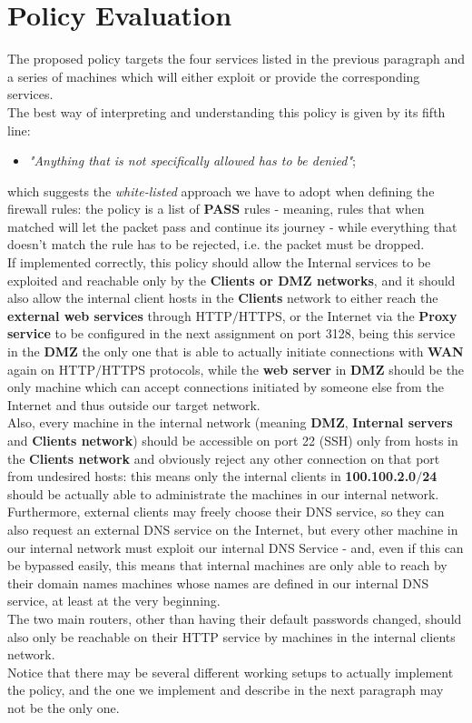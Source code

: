\section{Policy Evaluation}
The proposed policy targets the four services listed in the previous paragraph and a series of machines which will either exploit or provide the corresponding services.\\
The best way of interpreting and understanding this policy is given by its fifth line:\\
\begin{itemize}
\item \textit{"Anything that is not specifically allowed has to be denied"};
\end{itemize}

which suggests the \textit{white-listed} approach we have to adopt when defining the firewall rules: the policy is a list of \textbf{PASS} rules - meaning, rules that when matched will let the packet pass and continue its journey - while everything that doesn't match the rule has to be rejected, i.e. the packet must be dropped.\\
If implemented correctly, this policy should allow the Internal services to be exploited and reachable only by the \textbf{Clients or DMZ networks}, and it should also allow the internal client hosts in the \textbf{Clients} network to either reach the \textbf{external web services} through HTTP$/$HTTPS, or the Internet via the \textbf{Proxy service} to be configured in the next assignment on port 3128, being this service in the \textbf{DMZ} the only one that is able to actually initiate connections with \textbf{WAN} again on HTTP$/$HTTPS protocols, while the \textbf{web server} in \textbf{DMZ} should be the only machine which can accept connections initiated by someone else from the Internet and thus outside our target network.\\
Also, every machine in the internal network (meaning \textbf{DMZ}, \textbf{Internal servers} and \textbf{Clients network}) should be accessible on port 22 (SSH) only from hosts in the \textbf{Clients network} and obviously reject any other connection on that port from undesired hosts: this means only the internal clients in \textbf{100.100.2.0$/$24} should be actually able to administrate the machines in our internal network.\\
Furthermore, external clients may freely choose their DNS service, so they can also request an external DNS service on the Internet, but every other machine in our internal network must exploit our internal DNS Service - and, even if this can be bypassed easily, this means that internal machines are only able to reach by their domain names machines whose names are defined in our internal DNS service, at least at the very beginning.\\
The two main routers, other than having their default passwords changed, should also only be reachable on their HTTP service by machines in the internal clients network.\\
Notice that there may be several different working setups to actually implement the policy, and the one we implement and describe in the next paragraph may not be the only one.\\

